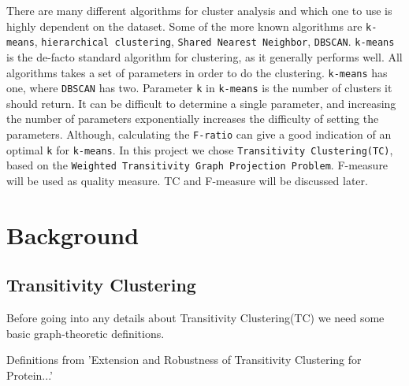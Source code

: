 \documentclass[a4paper,10pt]{article}
\theoremstyle{plain}
\theoremstyle{definition}
\begin{document}
There are many different algorithms for cluster analysis and which one to use is highly dependent on the dataset. Some of the more known algorithms are \texttt{k-means}, \texttt{hierarchical clustering}, \texttt{Shared Nearest Neighbor}, \texttt{DBSCAN}. \texttt{k-means} is the de-facto standard algorithm for clustering, as it generally performs well. All algorithms takes a set of parameters in order to do the clustering. \texttt{k-means} has one, where \texttt{DBSCAN} has two. Parameter \texttt{k} in \texttt{k-means} is the number of clusters it should return. It can be difficult to determine a single parameter, and increasing the number of parameters exponentially increases the difficulty of setting the parameters. Although, calculating the \texttt{F-ratio} can give a good indication of an optimal \texttt{k} for \texttt{k-means}. In this project we chose \texttt{Transitivity Clustering(TC)}, based on the \texttt{Weighted Transitivity Graph Projection Problem}. F-measure will be used as quality measure. TC and F-measure will be discussed later.


\newpage
\section{Background}

\subsection{Transitivity Clustering}

Before going into any details about Transitivity Clustering(TC) we need some basic graph-theoretic definitions.
\begin{description}
	\item[Definitions from 'Extension and Robustness of Transitivity Clustering for Protein...']
\end{description}
\end{document}
